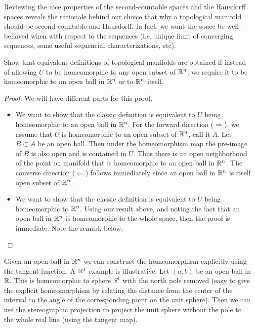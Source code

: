 Reviewing the nice properties of the second-countable spaces and the Hausdorff spaces reveals the rationale behind our choice that why a topological manifold should be second-countable and Hausdorff. In fact, we want the space be well-behaved when with respect to the sequences (i.e. unique limit of converging sequences, some useful sequencial characterizations, etc).


\begin{problem}
	Show that equivalent definitions of topological manifolds are obtained if instead of allowing $ U $ to be homeomorphic to any open subset of $ \mathbb{R}^n $, we require it to be homeomorphic to an open ball in $ \mathbb{R}^n $ or to $ \mathbb{R}^n $ itself.
\end{problem}
\begin{proof}
	We will have different parts for this proof.
	\begin{itemize}
		\item We want to show that the classic definition is equivalent to $ U $ being homeomorphic to an open ball in $ \mathbb{R}^n $. For the forward direction ($ \boxed{\Longrightarrow} $), we assume that $ U $ is homeomorphic to an open subset of $ \mathbb{R}^n $, call it $ A $. Let $ B \subset A $ be an open ball. Then under the homeomorphism map the pre-image of $ B $ is also open and is contained in $ U $. Thus there is an open neighborhood of the point on manifold that is homeomorphic to an open ball in $ \mathbb{R}^n $. The converse direction ($ \boxed{\Longleftarrow} $) follows immediately since an open ball in $ \mathbb{R}^n $ is itself open subset of $ \mathbb{R}^n $.
		
		\item We want to show that the classic definition is equivalent to $ U $ being homeomorphic to $ \mathbb{R}^n $. Using our result above, and noting the fact that an open ball in $ \mathbb{R}^n $ is homeomorphic to the whole space, then the proof is immediate. Note the remark below.
	\end{itemize}
\end{proof}
\begin{remark}
	Given an open ball in $ \mathbb{R}^n $ we can construct the homeomorphism explicitly using the tangent function. A $ \mathbb{R}^1 $ example is illustrative. Let $ (a,b) $ be an open ball in $ \mathbb{R} $. This is homeomorphic to sphere $ S^1 $ with the north pole removed (easy to give the explicit homeomorphism by relating the distance from the center of the interval to the angle of the corresponding point on the unit sphere). Then we can use the stereographic projection to project the unit sphere without the pole to the whole real line (using the tangent map).
\end{remark}








